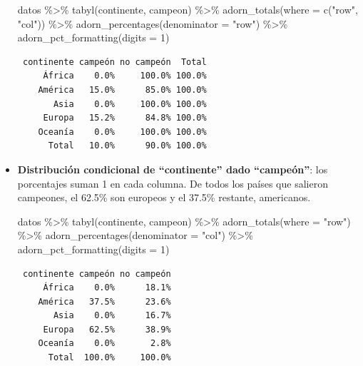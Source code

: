 \documentclass[
]{book}
\newenvironment{Shaded}{\begin{snugshade}}{\end{snugshade}}
\newcommand{\AttributeTok}[1]{\textcolor[rgb]{0.77,0.63,0.00}{#1}}
\newcommand{\DecValTok}[1]{\textcolor[rgb]{0.00,0.00,0.81}{#1}}
\newcommand{\FunctionTok}[1]{\textcolor[rgb]{0.00,0.00,0.00}{#1}}
\newcommand{\NormalTok}[1]{#1}
\newcommand{\SpecialCharTok}[1]{\textcolor[rgb]{0.00,0.00,0.00}{#1}}
\newcommand{\StringTok}[1]{\textcolor[rgb]{0.31,0.60,0.02}{#1}}
\begin{document}
\begin{itemize}
\begin{Shaded}
\begin{Highlighting}[]
\NormalTok{datos }\SpecialCharTok{\%\textgreater{}\%} 
  \FunctionTok{tabyl}\NormalTok{(continente, campeon) }\SpecialCharTok{\%\textgreater{}\%} 
  \FunctionTok{adorn\_totals}\NormalTok{(}\AttributeTok{where =} \FunctionTok{c}\NormalTok{(}\StringTok{"row"}\NormalTok{, }\StringTok{"col"}\NormalTok{)) }\SpecialCharTok{\%\textgreater{}\%} 
  \FunctionTok{adorn\_percentages}\NormalTok{(}\AttributeTok{denominator =} \StringTok{"row"}\NormalTok{) }\SpecialCharTok{\%\textgreater{}\%}
  \FunctionTok{adorn\_pct\_formatting}\NormalTok{(}\AttributeTok{digits =} \DecValTok{1}\NormalTok{)}
\end{Highlighting}
\end{Shaded}

\begin{verbatim}
 continente campeón no campeón  Total
     África    0.0%     100.0% 100.0%
    América   15.0%      85.0% 100.0%
       Asia    0.0%     100.0% 100.0%
     Europa   15.2%      84.8% 100.0%
    Oceanía    0.0%     100.0% 100.0%
      Total   10.0%      90.0% 100.0%
\end{verbatim}
\item
  \textbf{Distribución condicional de ``continente'' dado ``campeón''}: los porcentajes suman 1 en cada columna. De todos los países que salieron campeones, el 62.5\% son europeos y el 37.5\% restante, americanos.

\begin{Shaded}
\begin{Highlighting}[]
\NormalTok{datos }\SpecialCharTok{\%\textgreater{}\%} 
  \FunctionTok{tabyl}\NormalTok{(continente, campeon) }\SpecialCharTok{\%\textgreater{}\%} 
  \FunctionTok{adorn\_totals}\NormalTok{(}\AttributeTok{where =} \StringTok{"row"}\NormalTok{) }\SpecialCharTok{\%\textgreater{}\%} 
  \FunctionTok{adorn\_percentages}\NormalTok{(}\AttributeTok{denominator =} \StringTok{"col"}\NormalTok{) }\SpecialCharTok{\%\textgreater{}\%}
  \FunctionTok{adorn\_pct\_formatting}\NormalTok{(}\AttributeTok{digits =} \DecValTok{1}\NormalTok{)}
\end{Highlighting}
\end{Shaded}

\begin{verbatim}
 continente campeón no campeón
     África    0.0%      18.1%
    América   37.5%      23.6%
       Asia    0.0%      16.7%
     Europa   62.5%      38.9%
    Oceanía    0.0%       2.8%
      Total  100.0%     100.0%
\end{verbatim}
\end{itemize}
\end{document}
